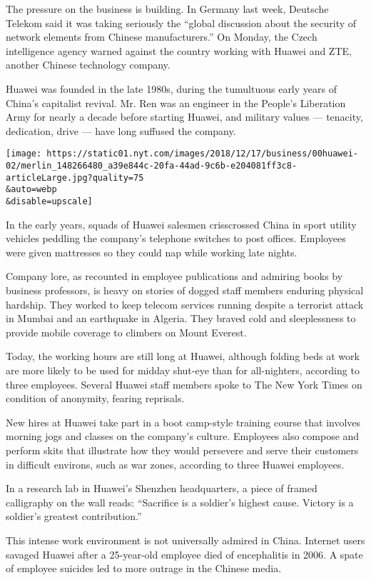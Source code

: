 The pressure on the business is building. In Germany last week, Deutsche
Telekom said it was taking seriously the ``global discussion about the
security of network elements from Chinese manufacturers.'' On Monday,
the Czech intelligence agency warned against the country working with
Huawei and ZTE, another Chinese technology company.

Huawei was founded in the late 1980s, during the tumultuous early years
of China's capitalist revival. Mr. Ren was an engineer in the People's
Liberation Army for nearly a decade before starting Huawei, and military
values --- tenacity, dedication, drive --- have long suffused the
company.

\texttt{[image: https://static01.nyt.com/images/2018/12/17/business/00huawei-02/merlin\_148266480\_a39e844c-20fa-44ad-9c6b-e204081ff3c8-articleLarge.jpg?quality=75\\\&auto=webp\\\&disable=upscale]}

In the early years, squads of Huawei salesmen crisscrossed China in
sport utility vehicles peddling the company's telephone switches to post
offices. Employees were given mattresses so they could nap while working
late nights.

Company lore, as recounted in employee publications and admiring books
by business professors, is heavy on stories of dogged staff members
enduring physical hardship. They worked to keep telecom services running
despite a terrorist attack in Mumbai and an earthquake in Algeria. They
braved cold and sleeplessness to provide mobile coverage to climbers on
Mount Everest.

Today, the working hours are still long at Huawei, although folding beds
at work are more likely to be used for midday shut-eye than for
all-nighters, according to three employees. Several Huawei staff members
spoke to The New York Times on condition of anonymity, fearing
reprisals.

New hires at Huawei take part in a boot camp-style training course that
involves morning jogs and classes on the company's culture. Employees
also compose and perform skits that illustrate how they would persevere
and serve their customers in difficult environs, such as war zones,
according to three Huawei employees.

In a research lab in Huawei's Shenzhen headquarters, a piece of framed
calligraphy on the wall reads: ``Sacrifice is a soldier's highest cause.
Victory is a soldier's greatest contribution.''

This intense work environment is not universally admired in China.
Internet users savaged Huawei after a 25-year-old employee died of
encephalitis in 2006. A spate of employee suicides led to more outrage
in the Chinese media.


